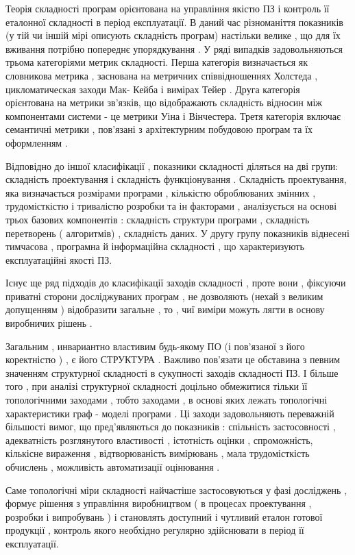 \documentclass[oneside,final,14pt]{extreport}
\begin{document}
Теорія складності програм орієнтована на управління якістю ПЗ і контроль її еталонної складності в період експлуатації. В даний час різноманіття показників (у тій чи іншій мірі описують складність програм) настільки велике , що для їх вживання потрібно попереднє упорядкування . У ряді випадків задовольняються трьома категоріями метрик складності. Перша категорія визначається як словникова метрика , заснована на метричних співвідношеннях Холстеда , цикломатическая заходи Мак- Кейба і вимірах Тейер . Друга категорія орієнтована на метрики зв'язків, що відображають складність відносин між компонентами системи - це метрики Уіна і Вінчестера. Третя категорія включає семантичні метрики , пов'язані з архітектурним побудовою програм та їх оформленням .

Відповідно до іншої класифікації , показники складності діляться на дві групи: складність проектування і складність функціонування . Складність проектування, яка визначається розмірами програми , кількістю оброблюваних змінних , трудомісткістю і тривалістю розробки та ін факторами , аналізується на основі трьох базових компонентів : складність структури програми , складність перетворень ( алгоритмів) , складність даних. У другу групу показників віднесені тимчасова , програмна й інформаційна складності , що характеризують експлуатаційні якості ПЗ.

Існує ще ряд підходів до класифікації заходів складності , проте вони , фіксуючи приватні сторони досліджуваних програм , не дозволяють (нехай з великим допущенням ) відобразити загальне , то , чиї виміри можуть лягти в основу виробничих рішень .

Загальним , инвариантно властивим будь-якому ПО (і пов'язаної з його коректністю ) , є його СТРУКТУРА . Важливо пов'язати це обставина з певним значенням структурної складності в сукупності заходів складності ПЗ. І більше того , при аналізі структурної складності доцільно обмежитися тільки її топологічними заходами , тобто заходами , в основі яких лежать топологічні характеристики граф - моделі програми . Ці заходи задовольняють переважній більшості вимог, що пред'являються до показників : спільність застосовності , адекватність розглянутого властивості , істотність оцінки , спроможність, кількісне вираження , відтворюваність вимірювань , мала трудомісткість обчислень , можливість автоматизації оцінювання .

Саме топологічні міри складності найчастіше застосовуються у фазі досліджень , формує рішення з управління виробництвом ( в процесах проектування , розробки і випробувань ) і становлять доступний і чутливий еталон готової продукції , контроль якого необхідно регулярно здійснювати в період її експлуатації.
\end{document}
